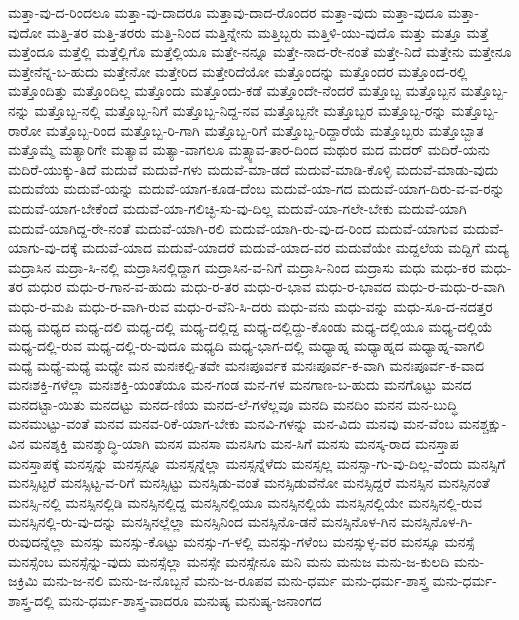 ಮತ್ತಾ-ವು-ದ-ರಿಂದಲೂ
ಮತ್ತಾ-ವು-ದಾದರೂ
ಮತ್ತಾವು-ದಾದ-ರೊಂದರ
ಮತ್ತಾ-ವುದು
ಮತ್ತಾ-ವುದೂ
ಮತ್ತಾ-ವುದೋ
ಮತ್ತಿ-ತರ
ಮತ್ತಿ-ತರರು
ಮತ್ತಿ-ನಿಂದ
ಮತ್ತಿನ್ನೇನು
ಮತ್ತಿಬ್ಬರು
ಮತ್ತಿಳಿ-ಯು-ವುದೊ
ಮತ್ತು
ಮತ್ತೂ
ಮತ್ತೆ
ಮತ್ತೆಂದೂ
ಮತ್ತೆಲ್ಲಿ
ಮತ್ತೆಲ್ಲಿಗೊ
ಮತ್ತೆಲ್ಲಿಯೂ
ಮತ್ತೇ-ನನ್ನೂ
ಮತ್ತೇ-ನಾದ-ರೇ-ನಂತೆ
ಮತ್ತೇ-ನಿದೆ
ಮತ್ತೇನು
ಮತ್ತೇನೂ
ಮತ್ತೇನೆನ್ನ-ಬ-ಹುದು
ಮತ್ತೇನೋ
ಮತ್ತೇರಿದ
ಮತ್ತೇರಿದೆಯೋ
ಮತ್ತೊಂದನ್ನು
ಮತ್ತೊಂದರ
ಮತ್ತೊಂದ-ರಲ್ಲಿ
ಮತ್ತೊಂದಿತ್ತು
ಮತ್ತೊಂದಿಲ್ಲ
ಮತ್ತೊಂದು
ಮತ್ತೊಂದು-ಕಡೆ
ಮತ್ತೊಂದೇ-ನೆಂದರೆ
ಮತ್ತೊಬ್ಬ
ಮತ್ತೊಬ್ಬನ
ಮತ್ತೊಬ್ಬ-ನನ್ನು
ಮತ್ತೊಬ್ಬ-ನಲ್ಲಿ
ಮತ್ತೊಬ್ಬ-ನಿಗೆ
ಮತ್ತೊಬ್ಬ-ನಿದ್ದ-ನವ
ಮತ್ತೊಬ್ಬನೇ
ಮತ್ತೊಬ್ಬರ
ಮತ್ತೊಬ್ಬ-ರನ್ನು
ಮತ್ತೊಬ್ಬ-ರಾರೋ
ಮತ್ತೊಬ್ಬ-ರಿಂದ
ಮತ್ತೊಬ್ಬ-ರಿ-ಗಾಗಿ
ಮತ್ತೊಬ್ಬ-ರಿಗೆ
ಮತ್ತೊಬ್ಬ-ರಿದ್ದಾರೆಯೆ
ಮತ್ತೊಬ್ಬರು
ಮತ್ತೊಬ್ಬಾತ
ಮತ್ತೊಮ್ಮೆ
ಮತ್ಯಾರಿಗೇ
ಮತ್ಯಾವ
ಮತ್ಯಾ-ವಾಗಲೂ
ಮತ್ಸ್ಯಾವ-ತಾರ-ದಿಂದ
ಮಥುರ
ಮದ
ಮದರ್
ಮದಿರೆ-ಯನು
ಮದಿರೆ-ಯುಕ್ಕು-ತಿದೆ
ಮದುವೆ
ಮದುವೆ-ಗಳು
ಮದುವೆ-ಮಾ-ಡದೆ
ಮದುವೆ-ಮಾಡಿ-ಕೊಳ್ಳಿ
ಮದುವೆ-ಮಾಡು-ವುದು
ಮದುವೆಯ
ಮದುವೆ-ಯನ್ನು
ಮದುವೆ-ಯಾಗ-ಕೂಡ-ದೆಂಬ
ಮದುವೆ-ಯಾ-ಗದ
ಮದುವೆ-ಯಾಗ-ದಿರು-ವ-ವ-ರನ್ನು
ಮದುವೆ-ಯಾಗ-ಬೇಕೆಂದೆ
ಮದುವೆ-ಯಾ-ಗಲಿಚ್ಛಿ-ಸು-ವು-ದಿಲ್ಲ
ಮದುವೆ-ಯಾ-ಗಲೇ-ಬೇಕು
ಮದುವೆ-ಯಾಗಿ
ಮದುವೆ-ಯಾಗಿದ್ದ-ರೇ-ನಂತೆ
ಮದುವೆ-ಯಾಗಿ-ರಲಿ
ಮದುವೆ-ಯಾಗಿ-ರು-ವು-ದ-ರಿಂದ
ಮದುವೆ-ಯಾಗುವ
ಮದುವೆ-ಯಾಗು-ವು-ದಕ್ಕೆ
ಮದುವೆ-ಯಾದ
ಮದುವೆ-ಯಾದರೆ
ಮದುವೆ-ಯಾದ-ವರ
ಮದುವೆಯೇ
ಮದ್ದಲೆಯ
ಮದ್ದಿಗೆ
ಮದ್ಯ
ಮದ್ರಾಸಿನ
ಮದ್ರಾ-ಸಿ-ನಲ್ಲಿ
ಮದ್ರಾಸಿನಲ್ಲಿದ್ದಾಗ
ಮದ್ರಾಸಿನ-ವ-ನಿಗೆ
ಮದ್ರಾಸಿ-ನಿಂದ
ಮದ್ರಾಸು
ಮಧು
ಮಧು-ಕರ
ಮಧು-ತರ
ಮಧುರ
ಮಧು-ರ-ಗಾನ-ವ-ಹುದು
ಮಧು-ರ-ತರ
ಮಧು-ರ-ಭಾವ
ಮಧು-ರ-ಭಾವದ
ಮಧು-ರ-ಮಧು-ರ-ವಾಗಿ
ಮಧು-ರ-ಮಪಿ
ಮಧು-ರ-ವಾಗಿ-ರುವ
ಮಧು-ರ-ವೆನಿ-ಸಿ-ದರು
ಮಧು-ವನು
ಮಧು-ವನ್ನು
ಮಧು-ಸೂ-ದ-ನದತ್ತರ
ಮಧ್ಯ
ಮಧ್ಯದ
ಮಧ್ಯ-ದಲಿ
ಮಧ್ಯ-ದಲ್ಲಿ
ಮಧ್ಯ-ದಲ್ಲಿದ್ದ
ಮಧ್ಯ-ದಲ್ಲಿದ್ದು-ಕೊಂಡು
ಮಧ್ಯ-ದಲ್ಲಿಯೂ
ಮಧ್ಯ-ದಲ್ಲಿಯೆ
ಮಧ್ಯ-ದಲ್ಲಿ-ರುವ
ಮಧ್ಯ-ದಲ್ಲಿ-ರು-ವುದೂ
ಮಧ್ಯದಿ
ಮಧ್ಯ-ಭಾಗ-ದಲ್ಲಿ
ಮಧ್ಯಾಹ್ನ
ಮಧ್ಯಾಹ್ನದ
ಮಧ್ಯಾಹ್ನ-ವಾಗಲಿ
ಮಧ್ಯೆ
ಮಧ್ಯೆ-ಮಧ್ಯೆ
ಮಧ್ಯೇ
ಮನ
ಮನಃಕಲ್ಪಿ-ತವೇ
ಮನಃಪೂರ್ವಕ
ಮನಃಪೂರ್ವ-ಕ-ವಾಗಿ
ಮನಃಪೂರ್ವ-ಕ-ವಾದ
ಮನಃಶಕ್ತಿ-ಗಳೆಲ್ಲಾ
ಮನಃಶಕ್ತಿ-ಯಂತೆಯೂ
ಮನ-ಗಂಡ
ಮನ-ಗಳ
ಮನಗಾಣ-ಬ-ಹುದು
ಮನಗೊಟ್ಟು
ಮನದ
ಮನದಟ್ಟಾ-ಯಿತು
ಮನದಟ್ಟು
ಮನದ-ಣಿಯ
ಮನದ-ಲೆ-ಗಳೆಲ್ಲವೂ
ಮನದಿ
ಮನದಿಂ
ಮನನ
ಮನ-ಬುದ್ಧಿ
ಮನಮುಟ್ಟು-ವಂತೆ
ಮನವ
ಮನವ-ರಿಕೆ-ಯಾಗ-ಬೇಕು
ಮನವಿ-ಗಳನ್ನು
ಮನ-ವಿದು
ಮನವು
ಮನ-ವೆಂಬ
ಮನಶ್ಚಕ್ಷು-ವಿನ
ಮನಶ್ಶಕ್ತಿ
ಮನಶ್ಶುದ್ಧಿ-ಯಾಗಿ
ಮನಸ
ಮನಸಾ
ಮನಸಿಗು
ಮನ-ಸಿಗೆ
ಮನಸು
ಮನಸ್ಕ-ರಾದ
ಮನಸ್ತಾಪ
ಮನಸ್ತಾಪಕ್ಕೆ
ಮನಸ್ಸನ್ನು
ಮನಸ್ಸನ್ನೂ
ಮನಸ್ಸನ್ನೆಲ್ಲಾ
ಮನಸ್ಸನ್ನೆಳೆದು
ಮನಸ್ಸಲ್ಲ
ಮನಸ್ಸಾ-ಗು-ವು-ದಿಲ್ಲ-ವೆಂದು
ಮನಸ್ಸಿಗೆ
ಮನಸ್ಸಿಟ್ಟರೆ
ಮನಸ್ಸಿಟ್ಟ-ವ-ರಿಗೆ
ಮನಸ್ಸಿಟ್ಟು
ಮನಸ್ಸಿಡು-ವಂತೆ
ಮನಸ್ಸಿಡುವೆನೋ
ಮನಸ್ಸಿದ್ದರೆ
ಮನಸ್ಸಿನ
ಮನಸ್ಸಿನಂತೆ
ಮನಸ್ಸಿ-ನಲ್ಲಿ
ಮನಸ್ಸಿನಲ್ಲಿಡಿ
ಮನಸ್ಸಿನಲ್ಲಿದ್ದ
ಮನಸ್ಸಿನಲ್ಲಿಯೂ
ಮನಸ್ಸಿನಲ್ಲಿಯೆ
ಮನಸ್ಸಿನಲ್ಲಿಯೇ
ಮನಸ್ಸಿನಲ್ಲಿ-ರುವ
ಮನಸ್ಸಿನಲ್ಲಿ-ರು-ವು-ದನ್ನು
ಮನಸ್ಸಿನಲ್ಲೆಲ್ಲಾ
ಮನಸ್ಸಿನಿಂದ
ಮನಸ್ಸಿನೊ-ಡನೆ
ಮನಸ್ಸಿನೊಳ-ಗಿನ
ಮನಸ್ಸಿನೊಳ-ಗಿ-ರುವುದನ್ನೆಲ್ಲಾ
ಮನಸ್ಸು
ಮನಸ್ಸು-ಕೊಟ್ಟು
ಮನಸ್ಸು-ಗ-ಳಲ್ಲಿ
ಮನಸ್ಸು-ಗಳೆಂಬ
ಮನಸ್ಸುಳ್ಳ-ವರ
ಮನಸ್ಸೂ
ಮನಸ್ಸೆ
ಮನಸ್ಸೆಂಬ
ಮನಸ್ಸೆನ್ನು-ವುದು
ಮನಸ್ಸೆಲ್ಲಾ
ಮನಸ್ಸೇ
ಮನಸ್ಸೇನೂ
ಮನಿ
ಮನು
ಮನುಜ
ಮನು-ಜ-ಕುಲದಿ
ಮನು-ಜಕ್ರಿಮಿ
ಮನು-ಜ-ನಲಿ
ಮನು-ಜ-ನೊಬ್ಬನೆ
ಮನು-ಜ-ರೂಪವ
ಮನು-ಧರ್ಮ
ಮನು-ಧರ್ಮ-ಶಾಸ್ತ್ರ
ಮನು-ಧರ್ಮ-ಶಾಸ್ತ್ರ-ದಲ್ಲಿ
ಮನು-ಧರ್ಮ-ಶಾಸ್ತ್ರ-ವಾದರೂ
ಮನುಷ್ಯ
ಮನುಷ್ಯ-ಜನಾಂಗದ
